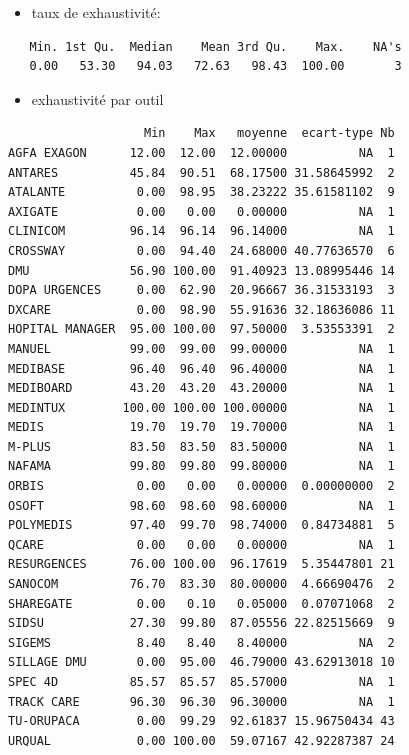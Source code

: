 \documentclass[]{article}
\begin{document}
\begin{itemize}
\itemsep1pt\parskip0pt
\item
  taux de exhaustivité:
\end{itemize}

\begin{verbatim}
   Min. 1st Qu.  Median    Mean 3rd Qu.    Max.    NA's 
   0.00   53.30   94.03   72.63   98.43  100.00       3 
\end{verbatim}

\begin{itemize}
\itemsep1pt\parskip0pt
\item
  exhaustivité par outil
\end{itemize}

\begin{verbatim}
                   Min    Max   moyenne  ecart-type Nb
AGFA EXAGON      12.00  12.00  12.00000          NA  1
ANTARES          45.84  90.51  68.17500 31.58645992  2
ATALANTE          0.00  98.95  38.23222 35.61581102  9
AXIGATE           0.00   0.00   0.00000          NA  1
CLINICOM         96.14  96.14  96.14000          NA  1
CROSSWAY          0.00  94.40  24.68000 40.77636570  6
DMU              56.90 100.00  91.40923 13.08995446 14
DOPA URGENCES     0.00  62.90  20.96667 36.31533193  3
DXCARE            0.00  98.90  55.91636 32.18636086 11
HOPITAL MANAGER  95.00 100.00  97.50000  3.53553391  2
MANUEL           99.00  99.00  99.00000          NA  1
MEDIBASE         96.40  96.40  96.40000          NA  1
MEDIBOARD        43.20  43.20  43.20000          NA  1
MEDINTUX        100.00 100.00 100.00000          NA  1
MEDIS            19.70  19.70  19.70000          NA  1
M-PLUS           83.50  83.50  83.50000          NA  1
NAFAMA           99.80  99.80  99.80000          NA  1
ORBIS             0.00   0.00   0.00000  0.00000000  2
OSOFT            98.60  98.60  98.60000          NA  1
POLYMEDIS        97.40  99.70  98.74000  0.84734881  5
QCARE             0.00   0.00   0.00000          NA  1
RESURGENCES      76.00 100.00  96.17619  5.35447801 21
SANOCOM          76.70  83.30  80.00000  4.66690476  2
SHAREGATE         0.00   0.10   0.05000  0.07071068  2
SIDSU            27.30  99.80  87.05556 22.82515669  9
SIGEMS            8.40   8.40   8.40000          NA  2
SILLAGE DMU       0.00  95.00  46.79000 43.62913018 10
SPEC 4D          85.57  85.57  85.57000          NA  1
TRACK CARE       96.30  96.30  96.30000          NA  1
TU-ORUPACA        0.00  99.29  92.61837 15.96750434 43
URQUAL            0.00 100.00  59.07167 42.92287387 24
\end{verbatim}
\end{document}
